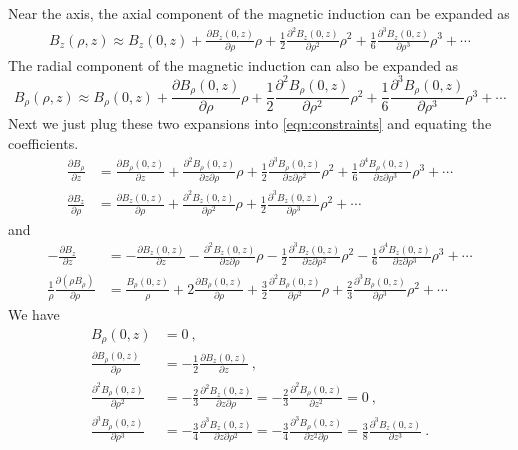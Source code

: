 \documentclass[12pt]{article}
\begin{document}
Near the axis, the axial component of the magnetic induction can be expanded as
\begin{align}
    B_z(\rho, z) \approx B_z(0,z) + \frac{\partial B_z(0, z)}{\partial \rho} \rho + \frac{1}{2} \frac{\partial^2 B_z(0,z)}{\partial \rho^2} \rho^2 + \frac{1}{6} \frac{\partial^3 B_z(0,z)}{\partial \rho^3} \rho^3+  \cdots
\end{align}
The radial component of the magnetic induction can also be expanded as
\begin{equation}
    B_\rho(\rho, z) \approx B_\rho(0,z) +  \frac{\partial B_\rho(0,z)}{\partial \rho}  \rho + \frac{1}{2} \frac{\partial^2 B_\rho(0,z)}{\partial \rho^2}  \rho^2 + \frac{1}{6} \frac{\partial^3 B_\rho(0,z)}{\partial \rho^3}  \rho^3  + \cdots
\end{equation}
Next we just plug these two expansions into \eqref{eqn:constraints} and equating the coefficients.
\begin{align}
    \frac{\partial B_\rho}{\partial z} &= \frac{\partial B_\rho(0,z)}{\partial z} + \frac{\partial^2 B_\rho(0,z)}{\partial z \partial \rho} \rho + \frac{1}{2} \frac{\partial^3 B_\rho(0,z)}{\partial z \partial \rho^2} \rho^2 + \frac{1}{6} \frac{\partial^4 B_\rho(0,z)}{\partial z \partial \rho^3} \rho^3 + \cdots\\
    \frac{\partial B_z}{\partial \rho} &= \frac{\partial B_z(0,z)}{\partial \rho} + \frac{\partial^2 B_z(0,z)}{\partial \rho^2} \rho + \frac{1}{2} \frac{\partial^3 B_z(0,z)}{\partial \rho^3} \rho^2 + \cdots
\end{align}
and
\begin{align}
    -\frac{\partial B_z}{\partial z} &= - \frac{\partial B_z(0,z)}{\partial z} - \frac{\partial^2 B_z(0,z)}{\partial z \partial \rho} \rho - \frac{1}{2} \frac{\partial^3 B_z(0,z)}{\partial z \partial \rho^2} \rho^2 - \frac{1}{6} \frac{\partial^4 B_z(0,z)}{\partial z \partial \rho^3} \rho^3 + \cdots\\
    \frac{1}{\rho}\frac{\partial (\rho B_\rho)}{\partial \rho} &= \frac{B_\rho(0,z)}{\rho} + 2 \frac{\partial B_\rho(0,z)}{\partial \rho} + \frac{3}{2} \frac{\partial^2 B_\rho(0,z)}{\partial \rho^2} \rho + \frac{2}{3} \frac{\partial^3 B_\rho(0,z)}{\partial \rho^3} \rho^2 + \cdots
\end{align}
We have
\begin{align}
    B_\rho(0,z) & = 0~,\\
    \frac{\partial B_\rho(0,z)}{\partial \rho} &= - \frac{1}{2}\frac{\partial B_z(0,z)}{\partial z}~, \\
    \frac{\partial^2 B_\rho(0,z)}{\partial \rho^2} &= - \frac{2}{3} \frac{\partial^2 B_z(0,z)}{\partial z \partial \rho} = - \frac{2}{3} \frac{\partial^2 B_\rho(0,z)}{\partial z^2} = 0~,\\
    \frac{\partial ^3 B_\rho(0,z)}{\partial \rho^3} &= -\frac{3}{4} \frac{\partial^3 B_z(0,z)}{\partial z \partial \rho^2} = -\frac{3}{4} \frac{\partial^3 B_\rho(0,z)}{\partial z^2 \partial \rho} = \frac{3}{8} \frac{\partial^3 B_z(0,z)}{\partial z^3}~.
\end{align}
\end{document}
